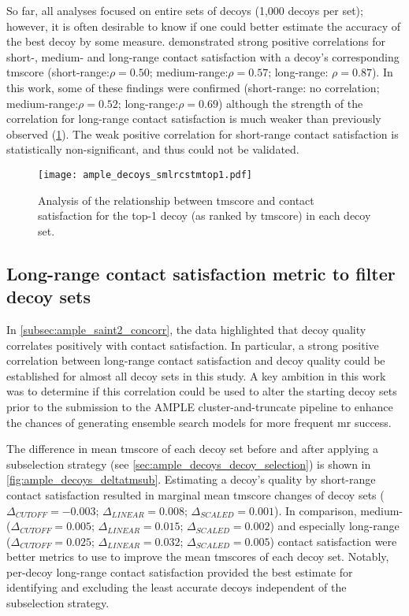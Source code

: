So far, all analyses focused on entire sets of decoys (1,000 decoys per set); however, it is often desirable to know if one could better estimate the accuracy of the best decoy by some measure. \textcite{Kosciolek2014-bt} demonstrated strong positive correlations for short-, medium- and long-range contact satisfaction with a decoy's corresponding \gls{tmscore} (short-range:$\rho=0.50$; medium-range:$\rho=0.57$; long-range: $\rho=0.87$). In this work, some of these findings were confirmed (short-range: no correlation; medium-range:$\rho=0.52$; long-range:$\rho=0.69$) although the strength of the correlation for long-range contact satisfaction is much weaker than previously observed (\cref{fig:ample_decoys_smlrcstmtop1}). The weak positive correlation for short-range contact satisfaction is statistically non-significant, and thus could not be validated. 

\begin{figure}[H]
	\centering
        \texttt{[image: ample\_decoys\_smlrcstmtop1.pdf]}
        \caption[Top-1 decoy TM-score and contact satisfaction analysis]{Analysis of the relationship between \gls{tmscore} and contact satisfaction for the top-1 decoy (as ranked by \gls{tmscore}) in each decoy set.}
	\label{fig:ample_decoys_smlrcstmtop1}
\end{figure}

\subsection{Long-range contact satisfaction metric to filter decoy sets}
In \cref{subsec:ample_saint2_concorr}, the data highlighted that decoy quality correlates positively with contact satisfaction. In particular, a strong positive correlation between long-range contact satisfaction and decoy quality could be established for almost all decoy sets in this study. A key ambition in this work was to determine if this correlation could be used to alter the starting decoy sets prior to the submission to the AMPLE cluster-and-truncate pipeline to enhance the chances of generating ensemble search models for more frequent \gls{mr} success.

The difference in mean \gls{tmscore} of each decoy set before and after applying a subselection strategy (see \cref{sec:ample_decoys_decoy_selection}) is shown in \cref{fig:ample_decoys_deltatmsub}. Estimating a decoy's quality by short-range contact satisfaction resulted in marginal mean \gls{tmscore} changes of decoy sets ($\Delta_{CUTOFF}=-0.003$; $\Delta_{LINEAR}=0.008$; $\Delta_{SCALED}=0.001$). In comparison, medium- ($\Delta_{CUTOFF}=0.005$; $\Delta_{LINEAR}=0.015$; $\Delta_{SCALED}=0.002$) and especially long-range ($\Delta_{CUTOFF}=0.025$; $\Delta_{LINEAR}=0.032$; $\Delta_{SCALED}=0.005$) contact satisfaction were better metrics to use to improve the mean \gls{tmscore}s of each decoy set. Notably, per-decoy long-range contact satisfaction provided the best estimate for identifying and excluding the least accurate decoys independent of the subselection strategy. 

